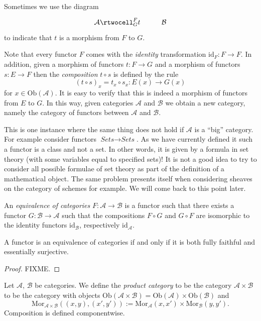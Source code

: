 \noindent
Sometimes we use the diagram
$$
\xymatrix{
\mathcal{A}
\rtwocell^F_{G}{t}
&
\mathcal{B}
}
$$
to indicate that $t$ is a morphism from $F$ to $G$.

\medskip\noindent
Note that every functor $F$ comes with the {\it identity} transformation
$\text{id}_F : F \to F$. In addition, given a morphism of
functors $t : F \to G$ and a morphism of functors $s : E \to F$
then the {\it composition} $t \circ s$ is defined by the rule
$$
(t \circ s)_x = t_x \circ s_x : E(x) \to G(x)
$$
for $x \in \text{Ob}(\mathcal{A})$.
It is easy to verify that this is indeed a morphism of functors
from $E$ to $G$.
In this way, given categories 
$\mathcal{A}$ and $\mathcal{B}$ we obtain a new category,
namely the category of functors between $\mathcal{A}$ and
$\mathcal{B}$.

\begin{remark}
This is one instance where the same thing does not hold if
$\mathcal{A}$ is a ``big'' category. For example consider
functors $\textit{Sets} \to \textit{Sets}$. As we have currently
defined it such a functor is a class and not a set. In other
words, it is given by a formula in set theory (with some variables
equal to specified sets)! It is not a good idea to try to consider
all possible formulae of set theory as part of the definition of 
a mathematical object. The same problem presents itself when
considering sheaves on the category of schemes for example.
We will come back to this point later.
\end{remark}

\begin{definition}
\label{definiton-equivalence-categories}
An {\it equivalence of categories}
$F : \mathcal{A} \to \mathcal{B}$ is a functor such that there
exists a functor $G : \mathcal{B} \to \mathcal{A}$ such that
the compositions $F \circ G$ and $G \circ F$ are isomorphic to the
identity functors $\text{id}_\mathcal{B}$,
respectively $\text{id}_\mathcal{A}$.
\end{definition}

\begin{lemma}
A functor is an equivalence of categories if and only if it is both fully
faithful and essentially surjective.
\end{lemma}

\begin{proof}
FIXME.
\end{proof}

\begin{definition}
\label{definition-product-category}
Let $\mathcal{A}$, $\mathcal{B}$ be categories.
We define the {\it product category} to be the category
$\mathcal{A}\times \mathcal{B}$ to be the category with
objects
$\text{Ob}(\mathcal{A}\times \mathcal{B}) =
\text{Ob}(\mathcal{A}) \times \text{Ob}(\mathcal{B})$
and 
$$
\text{Mor}_{\mathcal{A}\times \mathcal{B}}((x,y), (x',y'))
:=
\text{Mor}_{\mathcal{A}}(x, x')\times
\text{Mor}_{\mathcal{B}}(y, y').
$$
Composition is defined componentwise.
\end{definition}


